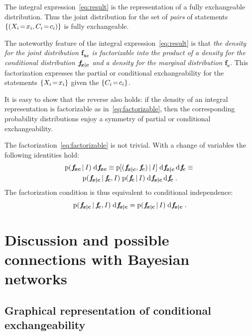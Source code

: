 \documentclass[\ifafour a4paper,12pt,\else a5paper,10pt,\fi%
onecolumn,oneside,article,%
british%
]{memoir}
\theoremstyle{remark}
\theoremstyle{innote}
\newcommand*{\di}{\mathrm{d}}%
\DeclarePairedDelimiter\set{\{}{\}}
\newcommand*{\pf}{\mathrm{p}}%
\renewcommand*{\|}[1][]{\nonscript\,#1\vert\nonscript\,\mathopen{}}
\renewcommand*{\=}{\TextOrMath\texteq\eq}
\newcommand*{\X}[1]{X_{#1}}
\newcommand*{\x}[1]{x_{#1}}
\newcommand*{\C}[1]{C_{#1}}
\newcommand*{\cc}[1]{c_{#1}}
\newcommand*{\fxc}{\bm{f_{\!x\bcond c}}}
\newcommand*{\fc}{\bm{f_{\!c}}}
\newcommand*{\fj}{\bm{f_{\!xc}}}
\newcommand*{\bcond}[1][]{\nonscript\,#1\bm{\vert}\nonscript\;\mathopen{}}
\begin{document}
The integral expression~\eqref{eq:result} is the representation of a fully
exchangeable distribution. Thus the joint distribution for the set of
\emph{pairs} of statements $\set{(\X{i}\=\x{i}, \C{i}\=\cc{i})}$ is
fully exchangeable.

The noteworthy feature of the integral expression~\eqref{eq:result} is that
\emph{the density for the joint distribution $\fj$ is factorizable into the
  product of a density for the conditional distribution $\fxc$ and a
  density for the marginal distribution $\fc$}. This factorization
expresses the partial or conditional exchangeability for the statements
$\set{\X{i}\=\x{i}}$ given the $\set{\C{i}\=\cc{i}}$.

It is easy to show that the reverse also holds: if the density of an
integral representation is factorizable as in~\eqref{eq:factorizable}, then
the corresponding probability distributions enjoy a symmetry of partial or
conditional exchangeability.

The factorization~\eqref{eq:factorizable} is not trivial. With a change of
variables the following identities hold:
\begin{multline}
  \label{eq:identities_factor}
  \pf(\fj\|I)\;\di\fj \equiv
  \pf[(\fxc,\fc) \| I] \;\di\fxc\,\di\fc
  \equiv{}\\
  \pf(\fxc \| \fc, I)  \;
  \pf(\fc \| I) \;\di\fxc\,\di\fc \;.
\end{multline}
The factorization condition is thus equivalent to conditional independence:
\begin{equation}
  \label{eq:cond_indep_ff}
  \pf(\fxc \| \fc, I) \;\di\fxc =
\pf(\fxc \| I) \;\di\fxc \;.
\end{equation}


\section{Discussion and possible connections with Bayesian networks}
\label{sec:discuss}

\subsection{Graphical representation of conditional exchangeability}
\label{sec:graph_repr}
\end{document}
